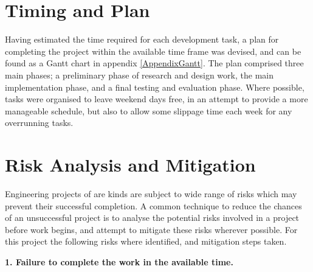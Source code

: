 
\section{Timing and Plan}

Having estimated the time required for each development task, a plan for completing the project within the available time frame was devised, and can be found as a Gantt chart in appendix \ref{AppendixGantt}. The plan comprised three main phases; a preliminary phase of research and design work, the main implementation phase, and a final testing and evaluation phase. Where possible, tasks were organised to leave weekend days free, in an attempt to provide a more manageable schedule, but also to allow some slippage time each week for any overrunning tasks.


\section{Risk Analysis and Mitigation}

Engineering projects of are kinds are subject to wide range of risks which may prevent their successful completion. A common technique to reduce the chances of an unsuccessful project is to analyse the potential risks involved in a project before work begins, and attempt to mitigate these risks wherever possible. For this project the following risks where identified, and mitigation steps taken.

\noindent\textbf{1. Failure to complete the work in the available time.}

